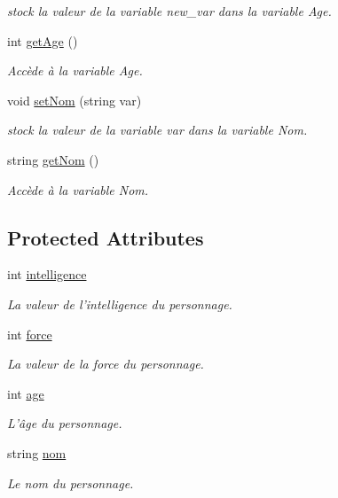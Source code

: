 \begin{DoxyCompactItemize}
\begin{DoxyCompactList}\small\item\em stock la valeur de la variable new\-\_\-var dans la variable Age. \end{DoxyCompactList}\item 
int \hyperlink{class_personnage_a991d7e1cf4662e245ad72e76b9eb9d53}{get\-Age} ()
\begin{DoxyCompactList}\small\item\em Accède à la variable Age. \end{DoxyCompactList}\item 
void \hyperlink{class_personnage_a5071fd1a8c64b3b2653681b8a867405d}{set\-Nom} (string var)
\begin{DoxyCompactList}\small\item\em stock la valeur de la variable var dans la variable Nom. \end{DoxyCompactList}\item 
string \hyperlink{class_personnage_a519301399a9bee1557858aa50a04a85a}{get\-Nom} ()
\begin{DoxyCompactList}\small\item\em Accède à la variable Nom. \end{DoxyCompactList}\end{DoxyCompactItemize}
\subsection*{Protected Attributes}
\begin{DoxyCompactItemize}
\item 
int \hyperlink{class_personnage_a8e9bc213349fb0553d76d4da6a711231}{intelligence}
\begin{DoxyCompactList}\small\item\em La valeur de l'intelligence du personnage. \end{DoxyCompactList}\item 
int \hyperlink{class_personnage_a823cd88582efee2ea29d199f96dcc677}{force}
\begin{DoxyCompactList}\small\item\em La valeur de la force du personnage. \end{DoxyCompactList}\item 
int \hyperlink{class_personnage_a2aa943e3c255f221eb9e57e8d134641f}{age}
\begin{DoxyCompactList}\small\item\em L'âge du personnage. \end{DoxyCompactList}\item 
string \hyperlink{class_personnage_acb7331b96dfc9f2aec78c60799030302}{nom}
\begin{DoxyCompactList}\small\item\em Le nom du personnage. \end{DoxyCompactList}\end{DoxyCompactItemize}


